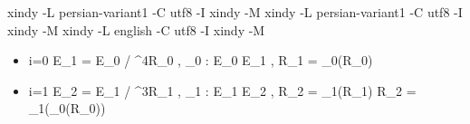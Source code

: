 xindy -L persian-variant1 -C utf8 -I xindy -M %
xindy -L persian-variant1 -C utf8 -I xindy -M %
xindy -L english -C utf8 -I xindy -M %


\begin{itemize}
	
	\item[] {}
	\begin{flalign}
	i=0 \Rightarrow \quad 
	E_1 = E_0 / \langle \ell^{4}R_0 \rangle , \quad 
	\phi_0 : E_0 \rightarrow E_1 , \quad 
	R_1 = \phi_0(R_0)
	\end{flalign}
	
	
	\item[] {}
	\begin{flalign}
	i=1 \Rightarrow \quad 
	E_2 = E_1 / \langle \ell^{3}R_1 \rangle , \quad 
	\phi_1 : E_1 \rightarrow E_2 , \quad 
	R_2 = \phi_1(R_1)
	R_2 = \phi_1(\phi_0(R_0))
	\end{flalign}
	
	
	
	
\end{itemize}



